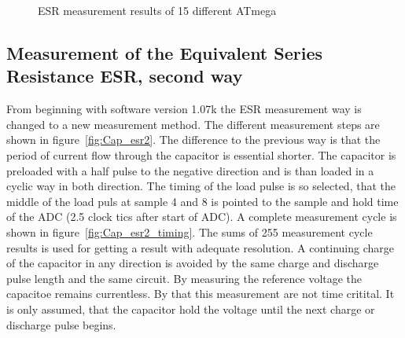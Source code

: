 \begin{figure}[H]
\centering

\caption{ESR measurement results of 15 different ATmega}
\label{fig:Cesr}
\end{figure}


\subsection{Measurement of the Equivalent Series Resistance ESR, second way}
\label{sec:ESR2}
From beginning with software version 1.07k the ESR measurement way is changed to a new measurement method.
The different measurement steps are shown in figure~\ref{fig:Cap_esr2}. The difference to the previous way is that
the period of current flow through the capacitor is essential shorter.
The capacitor is preloaded with a half pulse to the negative direction and is than loaded in a cyclic way in both
direction.
The timing of the load pulse is so selected, that the middle of the load puls at sample 4 and 8 is
pointed to the sample and hold time of the ADC (2.5 clock tics after start of ADC). 
A complete measurement cycle is shown in figure~\ref{fig:Cap_esr2_timing}.
The sums of 255 measurement cycle results is used for getting a result with adequate resolution. 
A continuing charge of the capacitor in any direction is avoided by the same charge and discharge pulse length
and the same circuit.
By measuring the reference voltage the capacitoe remains currentless. By that this measurement are not time critital.
It is only assumed, that the capacitor hold the voltage until the next charge or discharge pulse begins.

